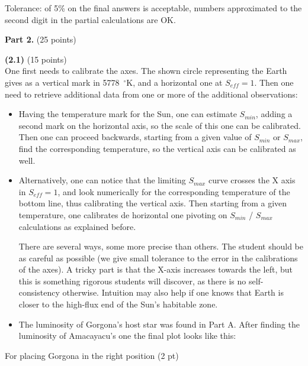 Tolerance: of 5\% on the final answers is acceptable, numbers approximated to
the second digit in the partial calculations are OK.


\medskip
\noindent\textbf{Part 2.} \hfill(25 points)

\noindent\textbf{(2.1)} \hfill(15 points)\\
One first needs to calibrate the axes. The shown circle representing the Earth
gives as a vertical mark in 5778~$^\circ$K,
and a horizontal one at $S_{eff} = 1$. Then one need to retrieve additional
data from one or more of the additional observations:

\begin{itemize}
\item Having the temperature mark for the Sun, one can estimate $S_{min}$,
adding a second mark on the horizontal axis, so the scale of this one can be
calibrated. Then one can proceed backwards, starting from a given value of
$S_{min}$ or $S_{max}$, find the corresponding temperature, so the vertical
axis can be calibrated as well.
\item Alternatively, one can notice that the limiting $S_{max}$ curve crosses
the X axis in $S_{eff} = 1$, and look numerically for the corresponding
temperature of the bottom line, thus calibrating the vertical axis. Then
starting from a given temperature, one calibrates de
horizontal one pivoting on $S_{min}$ / $S_{max}$ calculations as explained
before.

There are several ways, some more precise than others. The student should be
as careful as possible (we give small tolerance to the error in the
calibrations of the axes). A tricky part is that the X-axis increases towards
the left, but this is something rigorous students will discover, as there is
no self-consistency otherwise. Intuition may also help if one knows that
Earth is closer to the high-flux end of the Sun's habitable zone.
\item The luminosity of Gorgona's host star was found in Part A. After
finding the luminosity of Amacayacu's one the final plot looks like this:
\end{itemize}

For placing Gorgona in the right position \hfill(2 pt)


